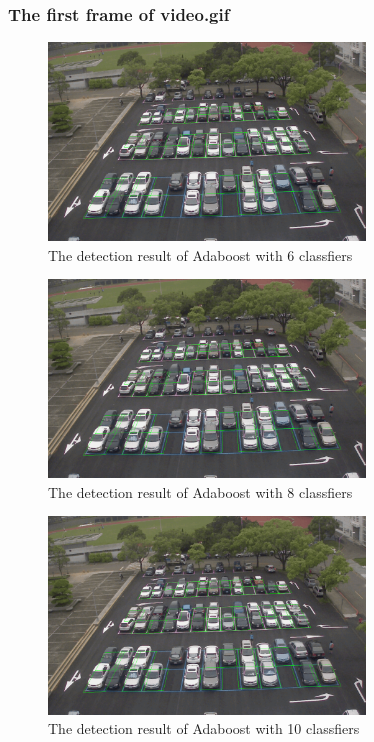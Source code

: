 \documentclass{article}[12pt, twocolumn]
\begin{document}
\subsubsection{The first frame of video.gif}

\begin{figure}[H]
    \centering
    \includegraphics[width=0.75\textwidth]{figure/Adaboost_first_frame_6.png}
    \caption{The detection result of Adaboost with 6 classfiers}
\end{figure}

\begin{figure}[H]
    \centering
    \includegraphics[width=0.75\textwidth]{figure/Adaboost_first_frame_8.png}
    \caption{The detection result of Adaboost with 8 classfiers}
\end{figure}

\begin{figure}[H]
    \centering
    \includegraphics[width=0.75\textwidth]{figure/Adaboost_first_frame_10.png}
    \caption{The detection result of Adaboost with 10 classfiers}
\end{figure}
\end{document}
